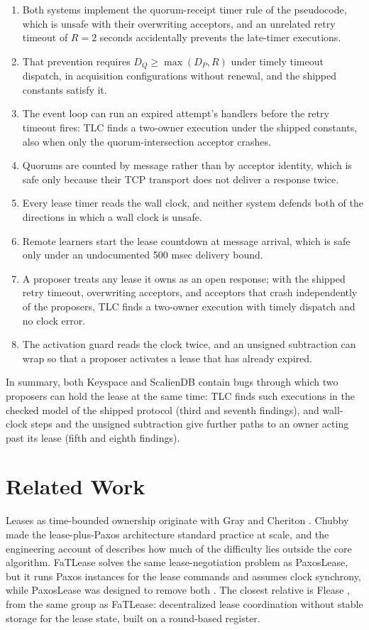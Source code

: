 \documentclass[final,5p,times,twocolumn,number]{elsarticle}
\begin{document}
\begin{enumerate}\itemsep0.25em
\item Both systems implement the quorum-receipt timer rule of the pseudocode, which is unsafe with their overwriting acceptors, and an unrelated retry timeout of $R = 2$ seconds accidentally prevents the late-timer executions.
\item That prevention requires $D_Q \geq \max(D_P, R)$ under timely timeout dispatch, in acquisition configurations without renewal, and the shipped constants satisfy it.
\item The event loop can run an expired attempt's handlers before the retry timeout fires: TLC finds a two-owner execution under the shipped constants, also when only the quorum-intersection acceptor crashes.
\item Quorums are counted by message rather than by acceptor identity, which is safe only because their TCP transport does not deliver a response twice.
\item Every lease timer reads the wall clock, and neither system defends both of the directions in which a wall clock is unsafe.
\item Remote learners start the lease countdown at message arrival, which is safe only under an undocumented 500 msec delivery bound.
\item A proposer treats any lease it owns as an open response; with the shipped retry timeout, overwriting acceptors, and acceptors that crash independently of the proposers, TLC finds a two-owner execution with timely dispatch and no clock error.
\item The activation guard reads the clock twice, and an unsigned subtraction can wrap so that a proposer activates a lease that has already expired.
\end{enumerate}

In summary, both Keyspace and ScalienDB contain bugs through which two proposers can hold the lease at the same time: TLC finds such executions in the checked model of the shipped protocol (third and seventh findings), and wall-clock steps and the unsigned subtraction give further paths to an owner acting past its lease (fifth and eighth findings).

\section{Related Work}\label{sec:related}

Leases as time-bounded ownership originate with Gray and Cheriton \cite{ref3}.  Chubby \cite{ref6} made the lease-plus-Paxos architecture standard practice at scale, and the engineering account of \cite{ref7} describes how much of the difficulty lies outside the core algorithm.  FaTLease \cite{ref8} solves the same lease-negotiation problem as PaxosLease, but it runs Paxos instances for the lease commands and assumes clock synchrony, while PaxosLease was designed to remove both \cite{ref1}.  The closest relative is Flease \cite{ref10}, from the same group as FaTLease: decentralized lease coordination without stable storage for the lease state, built on a round-based register.
\end{document}
